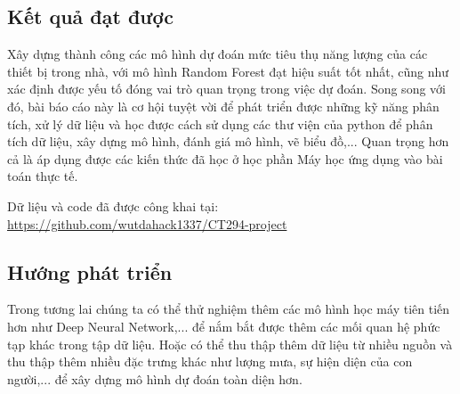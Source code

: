 \subsection{Kết quả đạt được}
Xây dựng thành công các mô hình dự đoán mức tiêu thụ năng lượng của các thiết bị trong nhà, với mô hình Random Forest đạt hiệu suất tốt nhất, cũng như xác định được yếu tố đóng vai trò quan trọng trong việc dự đoán. Song song với đó, bài báo cáo này là cơ hội tuyệt vời để phát triển được những kỹ năng phân tích, xử lý dữ liệu và học được cách sử dụng các thư viện của python để phân tích dữ liệu, xây dựng mô hình, đánh giá mô hình, vẽ biểu đồ,... Quan trọng hơn cả là áp dụng được các kiến thức đã học ở học phần Máy học ứng dụng vào bài toán thực tế.

Dữ liệu và code đã được công khai tại:
\url{https://github.com/wutdahack1337/CT294-project}

\subsection{Hướng phát triển}
Trong tương lai chúng ta có thể thử nghiệm thêm các mô hình học máy tiên tiến hơn như Deep Neural Network,... để nắm bắt được thêm các mối quan hệ phức tạp khác trong tập dữ liệu. Hoặc có thể thu thập thêm dữ liệu từ nhiều nguồn và thu thập thêm nhiều đặc trưng khác như lượng mưa, sự hiện diện của con người,... để xây dựng mô hình dự đoán toàn diện hơn.
